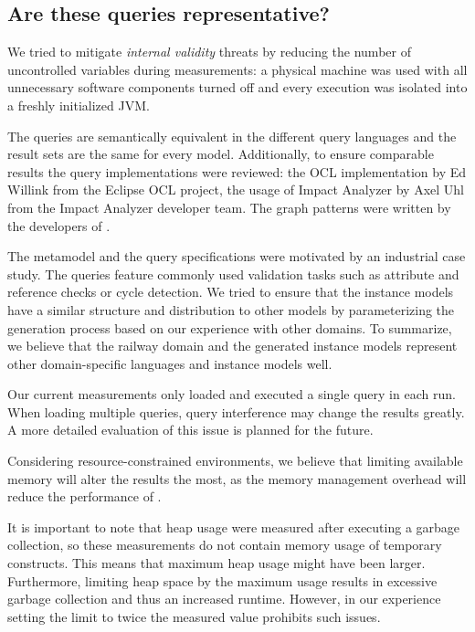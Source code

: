 \subsection{Are these queries representative?}


We tried to mitigate \emph{internal validity} threats by reducing the number of
uncontrolled variables during measurements: a physical machine was used with all
unnecessary software components turned off and every execution was isolated into
a freshly initialized JVM.

The queries are semantically equivalent in the different query languages and the
result sets are the same for every model. Additionally, to ensure comparable
results the query implementations were reviewed: the OCL
implementation by Ed Willink from the Eclipse OCL project, the usage of Impact
Analyzer by Axel Uhl from the Impact Analyzer developer team. The graph patterns
were written by the developers of \incquery{}.

The metamodel and the query specifications were motivated by an industrial case
study. The queries feature commonly used validation tasks such as
attribute and reference checks or cycle detection. We tried to ensure that the
instance models have a similar structure and distribution to other models by
parameterizing the generation process based on our experience with other
domains. To summarize, we believe that the railway domain and the generated
instance models represent other domain-specific languages and instance
models well.

Our current measurements only loaded and executed a single query in each run.
When loading multiple queries, query interference may change the results
greatly. A more detailed evaluation of this issue is planned for the future.

Considering resource-constrained environments, we believe that limiting
available memory will alter the results the most, as the memory management
overhead will reduce the performance of \incquery{}.

It is important to note that heap usage were measured after executing a garbage
collection, so these measurements do not contain memory usage of temporary
constructs. This means that maximum heap usage might have been larger. Furthermore,
limiting heap space by the maximum usage results in excessive garbage collection
and thus an increased runtime. However, in our experience setting the limit to
twice the measured value prohibits such issues.

